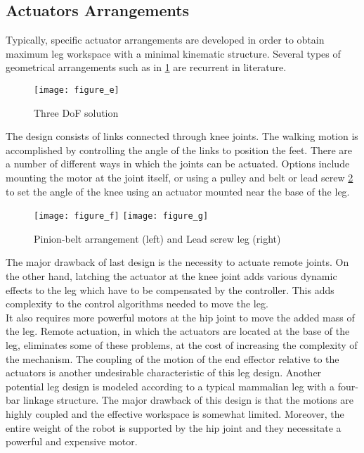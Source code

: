 \subsection{Actuators Arrangements}
Typically, specific actuator arrangements are developed in order to obtain maximum leg workspace with a minimal kinematic structure. Several types of geometrical arrangements such as in \ref{figure_e} are recurrent in literature.
\begin{figure}[h]
	\centering
	\texttt{[image: figure\_e]}
	\caption{Three DoF solution}
	\label{figure_e}
\end{figure}

The design consists of links connected through knee joints. The walking motion is accomplished by controlling the angle of the links to position the feet. There are a number of different ways in which the joints can be actuated. Options include mounting the motor at the joint itself, or using a pulley and belt or lead screw \ref{figure_f} to set the angle of the knee using an actuator mounted near the base of the leg.
\begin{figure}[h]
	\centering
	\texttt{[image: figure\_f]}\qquad
    	\texttt{[image: figure\_g]}
	\caption{Pinion-belt arrangement (left) and Lead screw leg (right)}
	\label{figure_f}
\end{figure}


The major drawback of last design is the necessity to actuate remote joints. On the other hand, latching the actuator at the knee joint adds various dynamic effects to the leg which have to be compensated by the controller. This adds complexity to the control algorithms needed to move the leg.\\
It also requires more powerful motors at the hip joint to move the added mass of the leg. Remote actuation, in which the actuators are located at the base of the leg, eliminates some of these problems, at the cost of increasing the complexity of the mechanism. The coupling of the motion of the end effector relative to the actuators is another undesirable characteristic of this leg design.  Another potential leg design is modeled according to a typical mammalian leg with a four-bar linkage structure. The major drawback of this design is that the motions are highly coupled and the effective workspace is somewhat limited. Moreover, the entire weight of the robot is supported by the hip joint and they necessitate a powerful and expensive motor.

